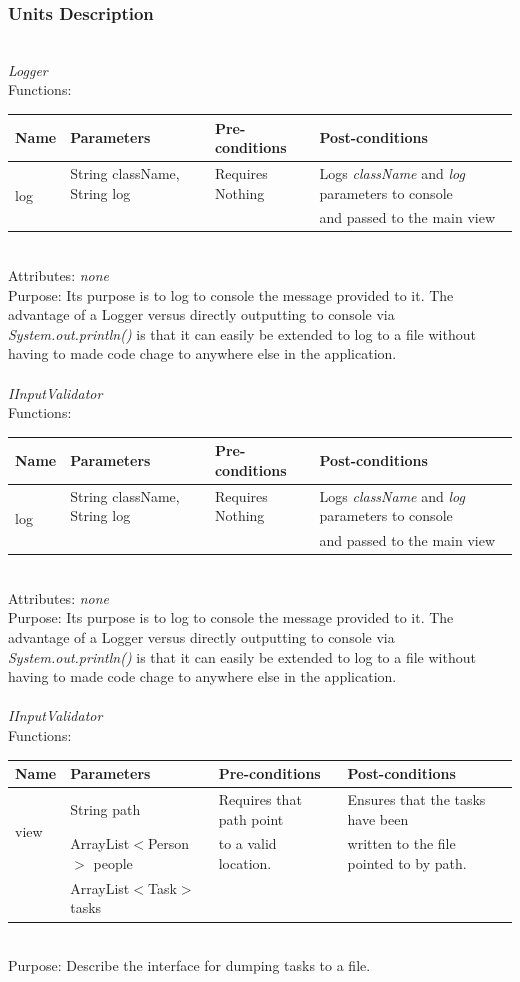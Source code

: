 \subsubsection{Units Description}
\\
\emph{Logger}\\
Functions:\\
\begin{tabular}{| l | l | l | l |}
\hline
Name & Parameters & Pre-conditions & Post-conditions\\
\hline
\multirow{2}{*}{log} & String className, String log & Requires Nothing & Logs \emph{className} and \emph{log} parameters to console
\\&  & & and passed to the main view
\\
\hline
\end{tabular}
\\
Attributes: \emph{none}
\\
Purpose: Its purpose is to log to console the message provided to it. The advantage of a Logger versus directly outputting to console via \emph{System.out.println()} is that it can easily be extended to log to a file without having to made code chage to anywhere else in the application.
\\
\\
\emph{IInputValidator}\\
Functions:\\
\begin{tabular}{| l | l | l | l |}
\hline
Name & Parameters & Pre-conditions & Post-conditions\\
\hline
\multirow{2}{*}{log} & String className, String log & Requires Nothing & Logs \emph{className} and \emph{log} parameters to console\\ 
			 &  & & and passed to the main view
\\
\hline
\end{tabular}
\\
Attributes: \emph{none}
\\
Purpose: Its purpose is to log to console the message provided to it. The advantage of a Logger versus directly outputting to console via \emph{System.out.println()} is that it can easily be extended to log to a file without having to made code chage to anywhere else in the application.
\\
\\
\emph{IInputValidator}\\
Functions:\\
\begin{tabular}{| l | l | l | l |}
\hline
Name & Parameters & Pre-conditions & Post-conditions\\
\hline
\multirow{2}{*}{view} & String path                                 & Requires that path point & Ensures that the tasks have been\\ 
			 & ArrayList$<$Person$>$ people & to a valid location.          & written to the file pointed to by path.\\ 
                                     & ArrayList$<$Task$>$ tasks       &                             & 
\\
\hline
\end{tabular}\\
Purpose: Describe the interface for dumping tasks to a file.